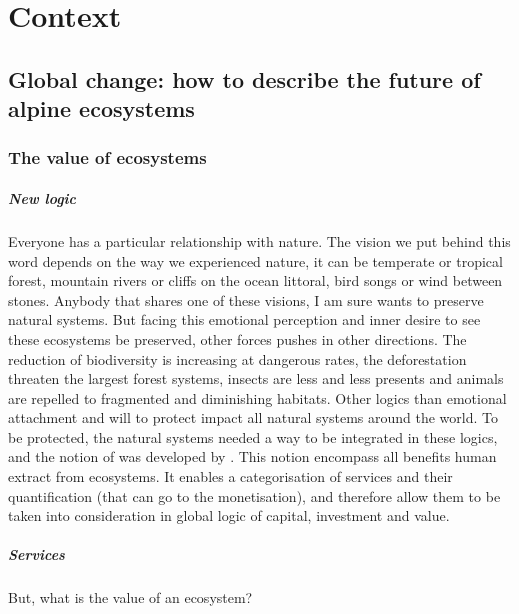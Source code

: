 

\chapter{Context}

\section{Global change: how to describe the future of alpine ecosystems}

\subsection{The value of ecosystems}

\paragraph{New logic}
Everyone has a particular relationship with nature. The vision we put behind this word depends on the way we experienced nature, it can be temperate or tropical forest, mountain rivers or cliffs on the ocean littoral, bird songs or wind between stones. Anybody that shares one of these visions, I am sure wants to preserve natural systems. But facing this emotional perception and inner desire to see these ecosystems be preserved, other forces pushes in other directions. The reduction of biodiversity is increasing at dangerous rates, the deforestation threaten the largest forest systems, insects are less and less presents and animals are repelled to fragmented and diminishing habitats. Other logics than emotional attachment and will to protect impact all natural systems around the world. To be protected, the natural systems needed a way to be integrated in these logics, and the notion of  was developed by \cite{costanza_value_1997}. This notion encompass all benefits human extract from ecosystems. It enables a categorisation of services and their quantification (that can go to the monetisation), and therefore allow them to be taken into consideration in global logic of capital, investment and value.


\paragraph{Services}
But, what is the value of an ecosystem?

